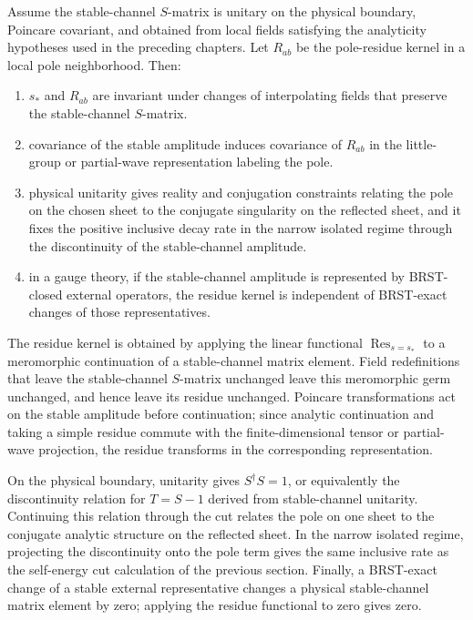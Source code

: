 \begin{remark}
Assume the stable-channel \(S\)-matrix is unitary on the physical boundary,
Poincare covariant, and obtained from local fields satisfying the analyticity
hypotheses used in the preceding chapters.  Let
\(R_{ab}\) be the pole-residue kernel in a local pole neighborhood.  Then:
\begin{enumerate}
\item \(s_\ast\) and \(R_{ab}\) are invariant under changes of interpolating
fields that preserve the stable-channel \(S\)-matrix.
\item covariance of the stable amplitude induces covariance of \(R_{ab}\) in
the little-group or partial-wave representation labeling the pole.
\item physical unitarity gives reality and conjugation constraints relating
the pole on the chosen sheet to the conjugate singularity on the reflected
sheet, and it fixes the positive inclusive decay rate in the narrow isolated
regime through the discontinuity of the stable-channel amplitude.
\item in a gauge theory, if the stable-channel amplitude is represented by
BRST-closed external operators, the residue kernel is independent of BRST-exact
changes of those representatives.
\end{enumerate}

The residue kernel is obtained by applying the linear functional
\(\operatorname{Res}_{s=s_\ast}\) to a meromorphic continuation of a
stable-channel matrix element.  Field redefinitions that leave the
stable-channel \(S\)-matrix unchanged leave this meromorphic germ unchanged,
and hence leave its residue unchanged.  Poincare transformations act on the
stable amplitude before continuation; since analytic continuation and taking a
simple residue commute with the finite-dimensional tensor or partial-wave
projection, the residue transforms in the corresponding representation.

On the physical boundary, unitarity gives \(S^\dagger S=1\), or equivalently
the discontinuity relation for \(T=S-1\) derived from stable-channel
unitarity.  Continuing this relation
through the cut relates the pole on one sheet to the conjugate analytic
structure on the reflected sheet.  In the narrow isolated regime, projecting
the discontinuity onto the pole term gives the same inclusive rate as the
self-energy cut calculation of the previous section.  Finally, a BRST-exact
change of a stable external representative changes a physical stable-channel
matrix element by zero; applying the residue functional to zero gives zero.
\end{remark}

